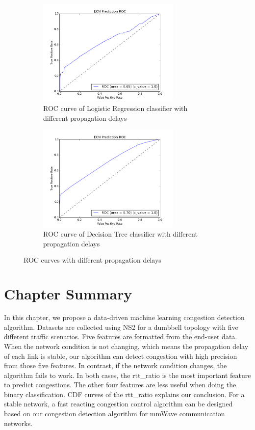\begin{figure}[!htb]\centering
\begin{subfigure}{0.49\textwidth}
\includegraphics[width=7cm]{LRRocDiffProp.png}
\caption{ROC curve of Logistic Regression classifier with different propagation delays}
\label{LRROCDiff}
\end{subfigure}
\begin{subfigure}{0.49\textwidth}
\includegraphics[width=7cm]{DTRocDiffProp.png}
\caption{ROC curve of Decision Tree classifier with different propagation delays}
\label{DTROCDiff}
\end{subfigure}
\caption{ROC curves with different propagation delays}
\label{fig:roc2}
\end{figure}




\section{Chapter Summary}
\label{Conclusions and Future Work}
In this chapter, we propose a data-driven machine learning congestion detection algorithm. Datasets are collected using NS2 for a dumbbell topology with five different traffic scenarios. Five features are formatted from the end-user data. When the network condition is not changing, which means the propagation delay of each link is stable, our algorithm can detect congestion with high precision from those five features. In contrast, if the network condition changes, the algorithm fails to work. In both cases, the rtt\_ratio is the most important feature to predict congestions. The other four features are less useful when doing the binary classification. CDF curves of the rtt\_ratio explains our conclusion. For a stable network, a fast reacting congestion control algorithm can be designed based on our congestion detection algorithm for mmWave communication networks.

